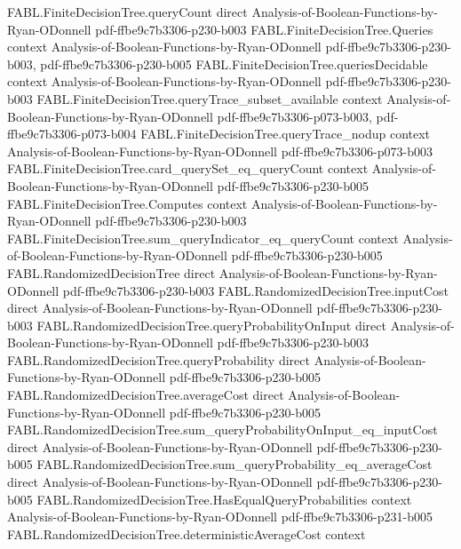 \begin{theorem}
  {FABL.FiniteDecisionTree.queryCount}
  {direct}
  {Analysis-of-Boolean-Functions-by-Ryan-ODonnell}
  {pdf-ffbe9c7b3306-p230-b003}
\proofstep
  {FABL.FiniteDecisionTree.Queries}
  {context}
  {Analysis-of-Boolean-Functions-by-Ryan-ODonnell}
  {pdf-ffbe9c7b3306-p230-b003,
    pdf-ffbe9c7b3306-p230-b005}
\proofstep
  {FABL.FiniteDecisionTree.queriesDecidable}
  {context}
  {Analysis-of-Boolean-Functions-by-Ryan-ODonnell}
  {pdf-ffbe9c7b3306-p230-b003}
\proofstep
  {FABL.FiniteDecisionTree.queryTrace_subset_available}
  {context}
  {Analysis-of-Boolean-Functions-by-Ryan-ODonnell}
  {pdf-ffbe9c7b3306-p073-b003,
    pdf-ffbe9c7b3306-p073-b004}
\proofstep
  {FABL.FiniteDecisionTree.queryTrace_nodup}
  {context}
  {Analysis-of-Boolean-Functions-by-Ryan-ODonnell}
  {pdf-ffbe9c7b3306-p073-b003}
\proofstep
  {FABL.FiniteDecisionTree.card_querySet_eq_queryCount}
  {context}
  {Analysis-of-Boolean-Functions-by-Ryan-ODonnell}
  {pdf-ffbe9c7b3306-p230-b005}
\proofstep
  {FABL.FiniteDecisionTree.Computes}
  {context}
  {Analysis-of-Boolean-Functions-by-Ryan-ODonnell}
  {pdf-ffbe9c7b3306-p230-b003}
\proofstep
  {FABL.FiniteDecisionTree.sum_queryIndicator_eq_queryCount}
  {context}
  {Analysis-of-Boolean-Functions-by-Ryan-ODonnell}
  {pdf-ffbe9c7b3306-p230-b005}
\proofstep
  {FABL.RandomizedDecisionTree}
  {direct}
  {Analysis-of-Boolean-Functions-by-Ryan-ODonnell}
  {pdf-ffbe9c7b3306-p230-b003}
\proofstep
  {FABL.RandomizedDecisionTree.inputCost}
  {direct}
  {Analysis-of-Boolean-Functions-by-Ryan-ODonnell}
  {pdf-ffbe9c7b3306-p230-b003}
\proofstep
  {FABL.RandomizedDecisionTree.queryProbabilityOnInput}
  {direct}
  {Analysis-of-Boolean-Functions-by-Ryan-ODonnell}
  {pdf-ffbe9c7b3306-p230-b003}
\proofstep
  {FABL.RandomizedDecisionTree.queryProbability}
  {direct}
  {Analysis-of-Boolean-Functions-by-Ryan-ODonnell}
  {pdf-ffbe9c7b3306-p230-b005}
\proofstep
  {FABL.RandomizedDecisionTree.averageCost}
  {direct}
  {Analysis-of-Boolean-Functions-by-Ryan-ODonnell}
  {pdf-ffbe9c7b3306-p230-b005}
\proofstep
  {FABL.RandomizedDecisionTree.sum_queryProbabilityOnInput_eq_inputCost}
  {direct}
  {Analysis-of-Boolean-Functions-by-Ryan-ODonnell}
  {pdf-ffbe9c7b3306-p230-b005}
\proofstep
  {FABL.RandomizedDecisionTree.sum_queryProbability_eq_averageCost}
  {direct}
  {Analysis-of-Boolean-Functions-by-Ryan-ODonnell}
  {pdf-ffbe9c7b3306-p230-b005}
\proofstep
  {FABL.RandomizedDecisionTree.HasEqualQueryProbabilities}
  {context}
  {Analysis-of-Boolean-Functions-by-Ryan-ODonnell}
  {pdf-ffbe9c7b3306-p231-b005}
\proofstep
  {FABL.RandomizedDecisionTree.deterministicAverageCost}
  {context}

\end{theorem}

